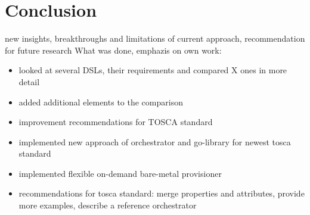 \chapter{Conclusion}



new insights, breakthroughs  and limitations of current approach, recommendation for future research
\newline
What was done, emphazis on own work:

\begin{itemize}
  \item looked at several DSLs, their requirements and compared X ones in more detail
  \item added additional elements to the comparison
  \item improvement recommendations for TOSCA standard
  \item implemented new approach of orchestrator and go-library for newest tosca standard
  \item implemented flexible on-demand bare-metal provisioner
  \item recommendations for tosca standard:
        merge properties and attributes,
        provide more examples,
        describe a reference orchestrator
\end{itemize}

